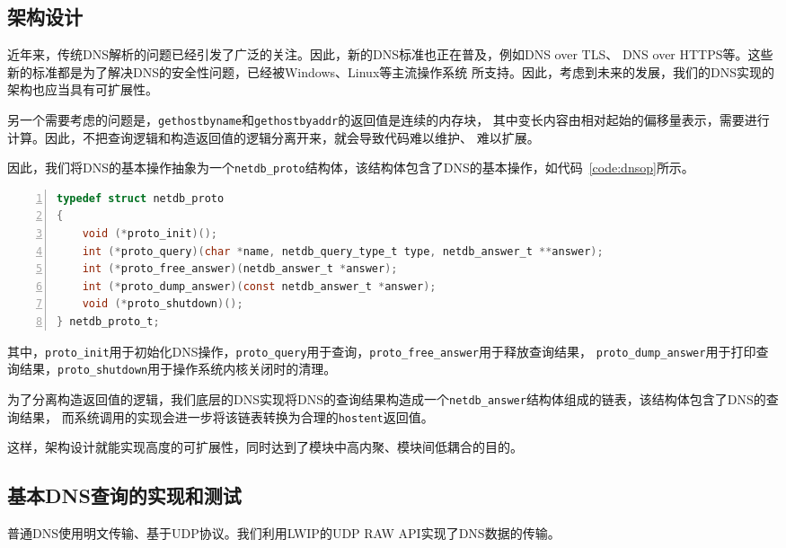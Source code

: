 \documentclass[a4paper,twoside]{ctexrep}
\begin{document}
\begin{spacing}{1.2}
\subsection{架构设计}

近年来，传统DNS解析的问题已经引发了广泛的关注。因此，新的DNS标准也正在普及，例如DNS over TLS\cite{hu2016specification}、
DNS over HTTPS\cite{hoffman2018dns}等。这些新的标准都是为了解决DNS的安全性问题，已经被Windows、Linux等主流操作系统
所支持。因此，考虑到未来的发展，我们的DNS实现的架构也应当具有可扩展性。

另一个需要考虑的问题是，\texttt{gethostbyname}和\texttt{gethostbyaddr}的返回值是连续的内存块，
其中变长内容由相对起始的偏移量表示，需要进行计算。因此，不把查询逻辑和构造返回值的逻辑分离开来，就会导致代码难以维护、
难以扩展。

因此，我们将DNS的基本操作抽象为一个\texttt{netdb\_proto}结构体，该结构体包含了DNS的基本操作，如代码~\ref{code:dnsop}所示。
\begin{lstlisting}[numbers=left,style=CppStyle,caption={DNS操作结构体},label={code:dnsop},language=C]
typedef struct netdb_proto
{
	void (*proto_init)();
	int (*proto_query)(char *name, netdb_query_type_t type, netdb_answer_t **answer);
	int (*proto_free_answer)(netdb_answer_t *answer);
	int (*proto_dump_answer)(const netdb_answer_t *answer);
	void (*proto_shutdown)();
} netdb_proto_t;
\end{lstlisting}
其中，\texttt{proto\_init}用于初始化DNS操作，\texttt{proto\_query}用于查询，\texttt{proto\_free\_answer}用于释放查询结果，
\texttt{proto\_dump\_answer}用于打印查询结果，\texttt{proto\_shutdown}用于操作系统内核关闭时的清理。

为了分离构造返回值的逻辑，我们底层的DNS实现将DNS的查询结果构造成一个\texttt{netdb\_answer}结构体组成的链表，该结构体包含了DNS的查询结果，
而系统调用的实现会进一步将该链表转换为合理的\texttt{hostent}返回值。

这样，架构设计就能实现高度的可扩展性，同时达到了模块中高内聚、模块间低耦合的目的。

\subsection{基本DNS查询的实现和测试}

普通DNS使用明文传输、基于UDP协议。我们利用LWIP的UDP RAW API实现了DNS数据的传输。


\end{spacing}
\end{document}
